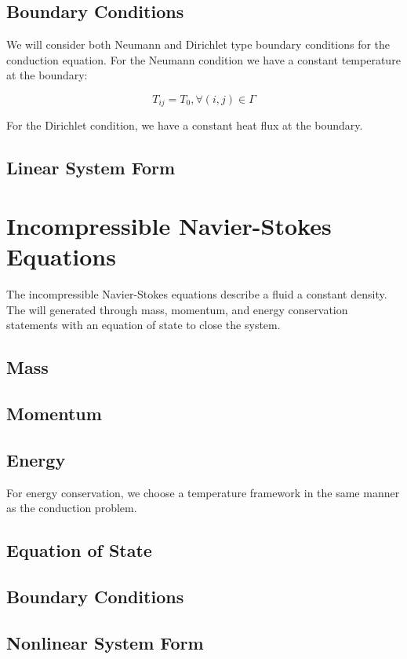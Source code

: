 \documentclass[letterpaper,12pt]{article}
\begin{document}
\subsection{Boundary Conditions}

We will consider both Neumann and Dirichlet type boundary conditions
for the conduction equation. For the Neumann condition we have a
constant temperature at the boundary:

\begin{equation}
  T_{ij} = T_0, \forall (i,j) \in \Gamma
  \label{eq:conduction_neumann}
\end{equation}

For the Dirichlet condition, we have a constant heat flux at the
boundary.

\subsection{Linear System Form}

\section{Incompressible Navier-Stokes Equations}
The incompressible Navier-Stokes equations describe a fluid a constant
density. The will generated through mass, momentum, and energy
conservation statements with an equation of state to close the system.

\subsection{Mass}

\subsection{Momentum}

\subsection{Energy}
For energy conservation, we choose a temperature framework in the same
manner as the conduction problem.

\subsection{Equation of State}

\subsection{Boundary Conditions}

\subsection{Nonlinear System Form}

\pagebreak
 
\end{document}
